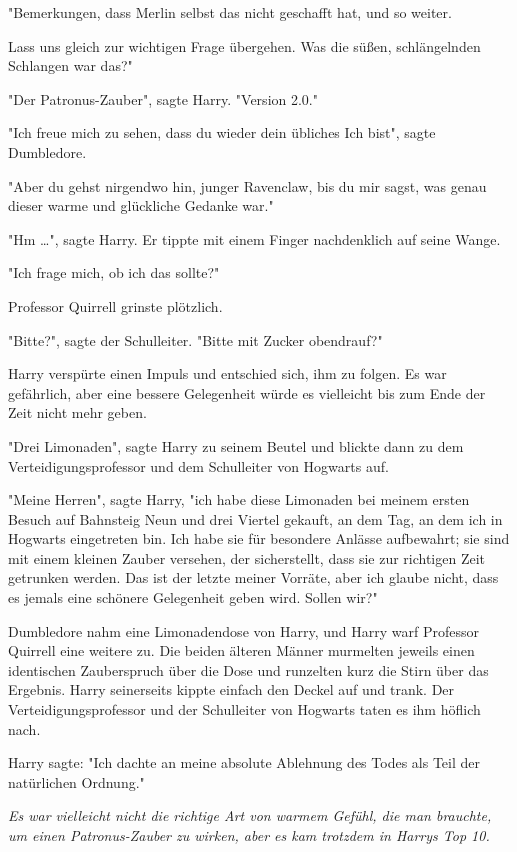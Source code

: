 {"Bemerkungen, dass Merlin selbst das nicht geschafft hat, und so weiter.

Lass uns gleich zur wichtigen Frage übergehen. Was die süßen, schlängelnden Schlangen war das?"

"Der Patronus-Zauber", sagte Harry. "Version 2.0."

"Ich freue mich zu sehen, dass du wieder dein übliches Ich bist", sagte Dumbledore.

"Aber du gehst nirgendwo hin, junger Ravenclaw, bis du mir sagst, was genau dieser warme und glückliche Gedanke war."

"Hm …", sagte Harry. Er tippte mit einem Finger nachdenklich auf seine Wange.

"Ich frage mich, ob ich das sollte?"

Professor Quirrell grinste plötzlich.

"Bitte?", sagte der Schulleiter. "Bitte mit Zucker obendrauf?"

Harry verspürte einen Impuls und entschied sich, ihm zu folgen. Es war gefährlich, aber eine bessere Gelegenheit würde es vielleicht bis zum Ende der Zeit nicht mehr geben.

"Drei Limonaden", sagte Harry zu seinem Beutel und blickte dann zu dem Verteidigungsprofessor und dem Schulleiter von Hogwarts auf.

"Meine Herren", sagte Harry, "ich habe diese Limonaden bei meinem ersten Besuch auf Bahnsteig Neun und drei Viertel gekauft, an dem Tag, an dem ich in Hogwarts eingetreten bin. Ich habe sie für besondere Anlässe aufbewahrt; sie sind mit einem kleinen Zauber versehen, der sicherstellt, dass sie zur richtigen Zeit getrunken werden. Das ist der letzte meiner Vorräte, aber ich glaube nicht, dass es jemals eine schönere Gelegenheit geben wird. Sollen wir?"

Dumbledore nahm eine Limonadendose von Harry, und Harry warf Professor Quirrell eine weitere zu. Die beiden älteren Männer murmelten jeweils einen identischen Zauberspruch über die Dose und runzelten kurz die Stirn über das Ergebnis. Harry seinerseits kippte einfach den Deckel auf und trank. Der Verteidigungsprofessor und der Schulleiter von Hogwarts taten es ihm höflich nach.

Harry sagte: "Ich dachte an meine absolute Ablehnung des Todes als Teil der natürlichen Ordnung."

\emph{Es war vielleicht nicht die richtige Art von warmem Gefühl, die man brauchte, um einen Patronus-Zauber zu wirken, aber es kam trotzdem in Harrys Top 10.}

}
